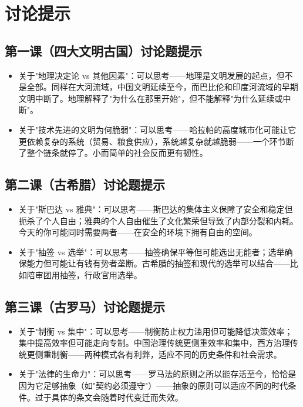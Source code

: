 \documentclass[a4paper,12pt]{ctexart}
\begin{document}
\section*{讨论提示}

\subsection*{第一课（四大文明古国）讨论题提示}
\begin{itemize}
  \item 关于"地理决定论 vs 其他因素"：可以思考——地理是文明发展的起点，但不是全部。同样在大河流域，中国文明延续至今，而巴比伦和印度河流域的早期文明中断了。地理解释了"为什么在那里开始"，但不能解释"为什么延续或中断"。
  \item 关于"技术先进的文明为何脆弱"：可以思考——哈拉帕的高度城市化可能让它更依赖复杂的系统（贸易、粮食供应），系统越复杂就越脆弱——一个环节断了整个链条就停了。小而简单的社会反而更有韧性。
\end{itemize}

\subsection*{第二课（古希腊）讨论题提示}
\begin{itemize}
  \item 关于"斯巴达 vs 雅典"：可以思考——斯巴达的集体主义保障了安全和稳定但扼杀了个人自由；雅典的个人自由催生了文化繁荣但导致了内部分裂和内耗。今天的你可能同时需要两者——在安全的环境下拥有自由的空间。
  \item 关于"抽签 vs 选举"：可以思考——抽签确保平等但可能选出无能者；选举确保能力但可能让有钱有势者垄断。古希腊的抽签和现代的选举可以结合——比如陪审团用抽签，行政官用选举。
\end{itemize}

\subsection*{第三课（古罗马）讨论题提示}
\begin{itemize}
  \item 关于"制衡 vs 集中"：可以思考——制衡防止权力滥用但可能降低决策效率；集中提高效率但可能走向专制。中国治理传统更侧重效率和集中，西方治理传统更侧重制衡——两种模式各有利弊，适应不同的历史条件和社会需求。
  \item 关于"法律的生命力"：可以思考——罗马法的原则之所以能存活至今，恰恰是因为它足够抽象（如"契约必须遵守"）——抽象的原则可以适应不同的时代条件。过于具体的条文会随着时代变迁而失效。
\end{itemize}
\end{document}
